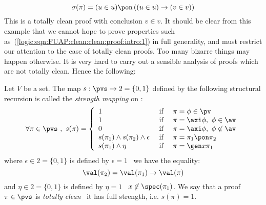     \[
    \sigma(\pi)=(u\in u)\pon\,((u\in u)\to(v\in v))
    \]
This is a totally clean proof with conclusion $v\in v$. It should be
clear from this example that we cannot hope to prove properties such
as~(\ref{logic:eqn:FUAP:clean:clean:proof:intro:1}) in full
generality, and must restrict our attention to the case of totally
clean proofs. Too many bizarre things may happen otherwise. It is
very hard to carry out a sensible analysis of proofs which are not
totally clean. Hence the following: 
\begin{defin}\label{logic:def:FUAP:clean:clean:proof}
Let $V$ be a set. The map $s:\pvs\to 2=\{0,1\}$ defined by the
following structural recursion is called the {\em strength mapping}
on \pvs:
 \begin{equation}\label{logic:eqn:FUAP:clean:clean:proof:1}
    \forall\pi\in\pvs\ ,\ s(\pi)=\left\{
                    \begin{array}{lcl}
                    1&\mbox{\ if\ }&\pi=\phi\in\pv\\
                    1&\mbox{\ if\ }&\pi=\axi\phi,\ \phi\in\av\\
                    0&\mbox{\ if\ }&\pi=\axi\phi,\ \phi\not\in\av\\
                    s(\pi_{1})\land s(\pi_{2})\land\epsilon
                    &\mbox{\ if\ }&\pi=\pi_{1}\pon\pi_{2}\\
                    s(\pi_{1})\land\eta&\mbox{\ if\ }&\pi=\gen x\pi_{1}\\
                    \end{array}\right.
    \end{equation}
where $\epsilon\in 2=\{0,1\}$ is defined by $\epsilon=1$ \ifand\
 we have the equality:
    \[
    \val(\pi_{2})=\val(\pi_{1})\to\val(\pi)
    \]
and $\eta\in 2=\{0,1\}$ is defined by $\eta=1$ \ifand\
$x\not\in\spec(\pi_{1})$. We say that a proof $\pi\in\pvs$ is {\em
totally clean} \ifand\ it has full strength, i.e. $s(\pi)=1$.
\end{defin}


